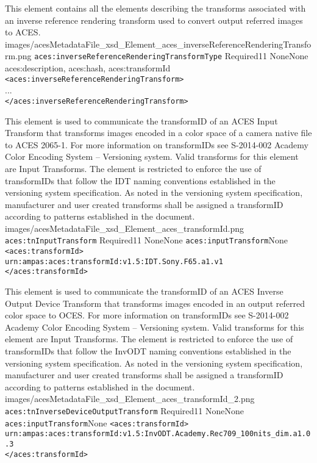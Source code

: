         {This element contains all the elements describing the transforms associated with an inverse reference rendering transform used to convert output referred images to ACES.}
        {images/acesMetadataFile_xsd_Element_aces_inverseReferenceRenderingTransform.png}
        {\texttt{aces:inverseReferenceRenderingTransformType}}
        {Required}{1}{1}
        {None}{None}
        {aces:description, aces:hash, aces:transformId}
        {\lstinline{<aces:inverseReferenceRenderingTransform>} \\
        ... \\
        \lstinline{</aces:inverseReferenceRenderingTransform>}}
        
        {This element is used to communicate the transformID of an ACES Input Transform that transforms images encoded in a color space of a camera native file to ACES 2065-1.  For more information on transformIDs see S-2014-002 Academy Color Encoding System -- Versioning system.  Valid transforms for this element are Input Transforms.  The element is restricted to enforce the use of transformIDs that follow the IDT naming conventions established in the versioning system specification.  As noted in the versioning system specification, manufacturer and user created transforms shall be assigned a transformID according to patterns established in the document.}
        {images/acesMetadataFile_xsd_Element_aces_transformId.png}
        {\texttt{aces:tnInputTransform}}
        {Required}{1}{1}
        {None}{None}
        {\texttt{aces:inputTransform}}{None}
        {\lstinline{<aces:transformId>} \\
        \lstinline{urn:ampas:aces:transformId:v1.5:IDT.Sony.F65.a1.v1} \\
        \lstinline{</aces:transformId>}}

        {This element is used to communicate the transformID of an ACES Inverse Output Device Transform that transforms images encoded in an output referred color space to OCES.  For more information on transformIDs see S-2014-002 Academy Color Encoding System -- Versioning system.  Valid transforms for this element are Input Transforms.  The element is restricted to enforce the use of transformIDs that follow the InvODT naming conventions established in the versioning system specification.  As noted in the versioning system specification, manufacturer and user created transforms shall be assigned a transformID according to patterns established in the document.}
        {images/acesMetadataFile_xsd_Element_aces_transformId_2.png}
        {\texttt{aces:tnInverseDeviceOutputTransform}}
        {Required}{1}{1}
        {None}{None}
        {\texttt{aces:inputTransform}}{None}
        {\lstinline{<aces:transformId>} \\
        \lstinline{urn:ampas:aces:transformId:v1.5:InvODT.Academy.Rec709_100nits_dim.a1.0.3} \\
        \lstinline{</aces:transformId>}}
        

